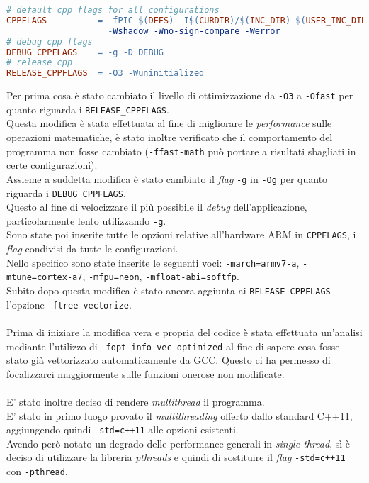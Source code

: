 \begin{lstlisting}[language=make]
# default cpp flags for all configurations
CPPFLAGS          = -fPIC $(DEFS) -I$(CURDIR)/$(INC_DIR) $(USER_INC_DIRS) -Wall
                    -Wshadow -Wno-sign-compare -Werror
# debug cpp flags
DEBUG_CPPFLAGS    = -g -D_DEBUG
# release cpp
RELEASE_CPPFLAGS  = -O3 -Wuninitialized
\end{lstlisting}

Per prima cosa è stato cambiato il livello di ottimizzazione da \verb|-O3| a 
\verb|-Ofast| per quanto riguarda i \verb|RELEASE_CPPFLAGS|.\\
Questa modifica è stata effettuata al fine di migliorare le \emph{performance} 
sulle operazioni matematiche, è stato inoltre verificato che il comportamento 
del programma non fosse cambiato (\verb|-ffast-math| può portare a risultati 
sbagliati in certe configurazioni).\\
Assieme a suddetta modifica è stato cambiato il \emph{flag} \verb|-g| in 
\verb|-Og| per quanto riguarda i \verb|DEBUG_CPPFLAGS|.\\
Questo al fine di velocizzare il più possibile il \emph{debug} 
dell'applicazione, particolarmente lento utilizzando \verb|-g|.\\
Sono state poi inserite tutte le opzioni relative all'hardware ARM in 
\verb|CPPFLAGS|, i \emph{flag} condivisi da tutte le configurazioni.\\
Nello specifico sono state inserite le seguenti voci: \verb|-march=armv7-a|, 
\verb|-mtune=cortex-a7|, \verb|-mfpu=neon|, \verb|-mfloat-abi=softfp|.\\
Subito dopo questa modifica è stato ancora aggiunta ai \verb|RELEASE_CPPFLAGS| 
l'opzione \verb|-ftree-vectorize|.\\
\\
Prima di iniziare la modifica vera e propria del codice è stata effettuata 
un'analisi mediante l'utilizzo di \verb|-fopt-info-vec-optimized| al fine di 
sapere cosa fosse stato già vettorizzato automaticamente da GCC. Questo ci ha 
permesso di focalizzarci maggiormente sulle funzioni onerose non modificate.\\
\\
E' stato inoltre deciso di rendere \emph{multithread} il programma.\\
E' stato in primo luogo provato il \emph{multithreading} offerto dallo standard 
C++11, aggiungendo quindi \verb|-std=c++11| alle opzioni esistenti.\\
Avendo però notato un degrado delle performance generali in \emph{single 
thread}, sì è deciso di utilizzare la libreria \emph{pthreads} e quindi di 
sostituire il \emph{flag} \verb|-std=c++11| con \verb|-pthread|.

